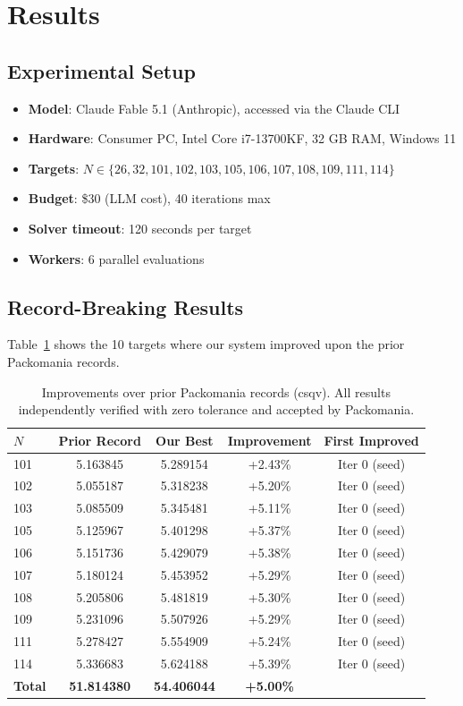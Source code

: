 \documentclass[11pt]{article}
\begin{document}
\section{Results}

\subsection{Experimental Setup}

\begin{itemize}
  \item \textbf{Model}: Claude Fable 5.1 (Anthropic), accessed via the Claude CLI
  \item \textbf{Hardware}: Consumer PC, Intel Core i7-13700KF, 32 GB RAM, Windows 11
  \item \textbf{Targets}: $N \in \{26, 32, 101, 102, 103, 105, 106, 107, 108, 109, 111, 114\}$
  \item \textbf{Budget}: \$30 (LLM cost), 40 iterations max
  \item \textbf{Solver timeout}: 120 seconds per target
  \item \textbf{Workers}: 6 parallel evaluations
\end{itemize}

\subsection{Record-Breaking Results}

Table~\ref{tab:results} shows the 10 targets where our system improved upon the prior
Packomania records.

\begin{table}[h]
\centering
\caption{Improvements over prior Packomania records (csqv). All results independently
verified with zero tolerance and accepted by Packomania.}
\label{tab:results}
\begin{tabular}{@{}lcccc@{}}
\toprule
$N$ & Prior Record & Our Best & Improvement & First Improved \\
\midrule
101 & 5.163845 & 5.289154 & +2.43\% & Iter 0 (seed) \\
102 & 5.055187 & 5.318238 & +5.20\% & Iter 0 (seed) \\
103 & 5.085509 & 5.345481 & +5.11\% & Iter 0 (seed) \\
105 & 5.125967 & 5.401298 & +5.37\% & Iter 0 (seed) \\
106 & 5.151736 & 5.429079 & +5.38\% & Iter 0 (seed) \\
107 & 5.180124 & 5.453952 & +5.29\% & Iter 0 (seed) \\
108 & 5.205806 & 5.481819 & +5.30\% & Iter 0 (seed) \\
109 & 5.231096 & 5.507926 & +5.29\% & Iter 0 (seed) \\
111 & 5.278427 & 5.554909 & +5.24\% & Iter 0 (seed) \\
114 & 5.336683 & 5.624188 & +5.39\% & Iter 0 (seed) \\
\midrule
\textbf{Total} & \textbf{51.814380} & \textbf{54.406044} & \textbf{+5.00\%} & \\
\bottomrule
\end{tabular}
\end{table}
\end{document}
